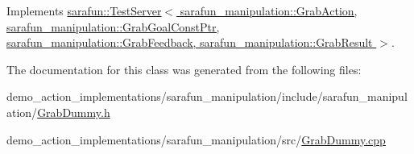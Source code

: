 Implements \hyperlink{classsarafun_1_1TestServer_a85b9721105c2a4b46bae26428433513e}{sarafun\-::\-Test\-Server$<$ sarafun\-\_\-manipulation\-::\-Grab\-Action, sarafun\-\_\-manipulation\-::\-Grab\-Goal\-Const\-Ptr, sarafun\-\_\-manipulation\-::\-Grab\-Feedback, sarafun\-\_\-manipulation\-::\-Grab\-Result $>$}.



The documentation for this class was generated from the following files\-:\begin{DoxyCompactItemize}
\item 
demo\-\_\-action\-\_\-implementations/sarafun\-\_\-manipulation/include/sarafun\-\_\-manipulation/\hyperlink{GrabDummy_8h}{Grab\-Dummy.\-h}\item 
demo\-\_\-action\-\_\-implementations/sarafun\-\_\-manipulation/src/\hyperlink{GrabDummy_8cpp}{Grab\-Dummy.\-cpp}\end{DoxyCompactItemize}
